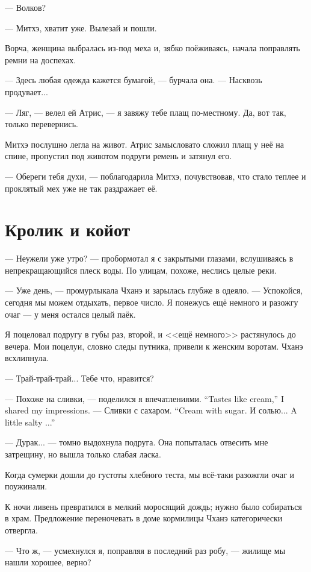 --- Волков?

--- Митхэ, хватит уже.
Вылезай и пошли.

Ворча, женщина выбралась из-под меха и, зябко поёживаясь, начала поправлять ремни на доспехах.

--- Здесь любая одежда кажется бумагой, --- бурчала она.
--- Насквозь продувает...

--- Ляг, --- велел ей Атрис, --- я завяжу тебе плащ по-местному.
Да, вот так, только перевернись.

Митхэ послушно легла на живот.
Атрис замысловато сложил плащ у неё на спине, пропустил под животом подруги ремень и затянул его.

--- Обереги тебя духи, --- поблагодарила Митхэ, почувствовав, что стало теплее и проклятый мех уже не так раздражает её.

\section{Кролик и койот}

--- Неужели уже утро? --- пробормотал я с закрытыми глазами, вслушиваясь в непрекращающийся плеск воды.
По улицам, похоже, неслись целые реки.

--- Уже день, --- промурлыкала Чханэ и зарылась глубже в одеяло.
--- Успокойся, сегодня мы можем отдыхать, первое число.
Я понежусь ещё немного и разожгу очаг --- у меня остался целый паёк.

Я поцеловал подругу в губы раз, второй, и <<ещё немного>> растянулось до вечера.
Мои поцелуи, словно следы путника, привели к женским воротам.
Чханэ всхлипнула.

--- Трай-трай-трай\FM...
Тебе что, нравится?

{--- Похоже на сливки, --- поделился я впечатлениями.}
{``Tastes like cream,'' I shared my impressions.}
{--- Сливки с сахаром.}
{``Cream with sugar.}
{И солью...}
{A little salty ...''}

--- Дурак... --- томно выдохнула подруга.
Она попыталась отвесить мне затрещину, но вышла только слабая ласка.

Когда сумерки дошли до густоты хлебного теста, мы всё-таки разожгли очаг и поужинали.

К ночи ливень превратился в мелкий моросящий дождь;
нужно было собираться в храм.
Предложение переночевать в доме кормилицы Чханэ категорически отвергла.

--- Что ж, --- усмехнулся я, поправляя в последний раз робу, --- жилище мы нашли хорошее, верно?

